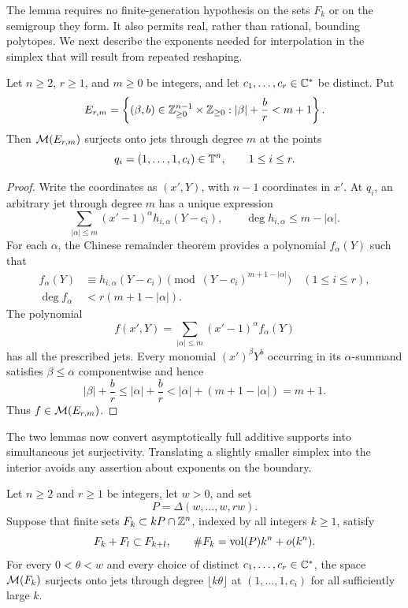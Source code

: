 The lemma requires no finite-generation hypothesis on the sets $F_k$ or on
the semigroup they form. It also permits real, rather than rational,
bounding polytopes. We next describe the exponents needed for interpolation
in the simplex that will result from repeated reshaping.

\begin{lemma}
\label{lem:simplex-interpolation}
Let $n\ge2$, $r\ge1$, and $m\ge0$ be integers, and let
$c_1,\ldots,c_r\in\mathbb C^*$ be distinct. Put
\[
 E_{r,m}=
 \left\{(\beta,b)\in\mathbb Z_{\ge0}^{n-1}\times\mathbb Z_{\ge0}:
       |\beta|+\frac br<m+1\right\}.
\]
Then $\mathcal M(E_{r,m})$ surjects onto jets through degree $m$ at the points
\[
 q_i=(1,\ldots,1,c_i)\in\mathbb T^n,\qquad 1\le i\le r.
\]
\end{lemma}

\begin{proof}
Write the coordinates as $(x',Y)$, with $n-1$ coordinates in $x'$. At $q_i$,
an arbitrary jet through degree $m$ has a unique expression
\[
 \sum_{|\alpha|\le m}(x'-1)^\alpha h_{i,\alpha}(Y-c_i),
 \qquad
 \deg h_{i,\alpha}\le m-|\alpha|.
\]
For each $\alpha$, the Chinese remainder theorem provides a polynomial
$f_\alpha(Y)$ such that
\[
 \begin{split}
 f_\alpha(Y)&\equiv h_{i,\alpha}(Y-c_i)
       \pmod{(Y-c_i)^{m+1-|\alpha|}}\quad(1\le i\le r),\\
 \deg f_\alpha&<r(m+1-|\alpha|).
 \end{split}
\]
The polynomial
\[
 f(x',Y)=\sum_{|\alpha|\le m}(x'-1)^\alpha f_\alpha(Y)
\]
has all the prescribed jets. Every monomial $(x')^\beta Y^b$ occurring in
its $\alpha$-summand satisfies $\beta\le\alpha$ componentwise and hence
\[
 |\beta|+\frac br
 \le |\alpha|+\frac br
 <|\alpha|+(m+1-|\alpha|)=m+1.
\]
Thus $f\in\mathcal M(E_{r,m})$.
\end{proof}

The two lemmas now convert asymptotically full additive supports into
simultaneous jet surjectivity. Translating a slightly smaller simplex into
the interior avoids any assertion about exponents on the boundary.

\begin{proposition}
\label{prop:asymptotic-jets}
Let $n\ge2$ and $r\ge1$ be integers, let $w>0$, and set
\[
 P=\Delta(w,\ldots,w,rw).
\]
Suppose that finite sets $F_k\subset kP\cap\mathbb Z^n$, indexed by all integers
$k\ge1$, satisfy
\[
 F_k+F_l\subset F_{k+l},
 \qquad
 \#F_k=\operatorname{vol}(P)k^n+o(k^n).
\]
For every $0<\theta<w$ and every choice of distinct
$c_1,\ldots,c_r\in\mathbb C^*$, the space $\mathcal M(F_k)$ surjects onto jets through
degree $\lfloor k\theta\rfloor$ at $(1,\ldots,1,c_i)$ for all sufficiently
large $k$.
\end{proposition}

